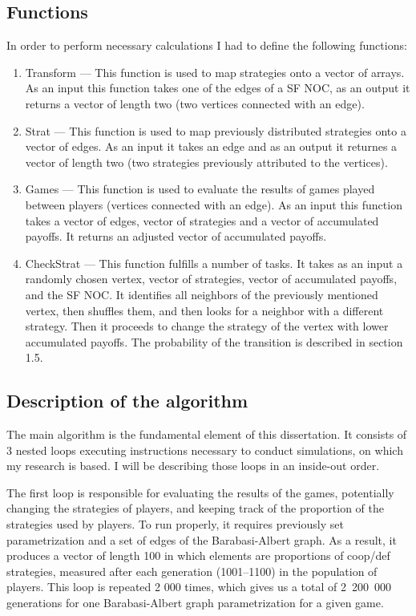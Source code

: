 \documentclass[english, twoside, 12pt, a4paper]{article}
\theoremstyle{definition}
\theoremstyle{plain}
\theoremstyle{remark}
\begin{document}
\subsection{Functions}
In order to perform necessary calculations I had to define the following functions:

\begin{enumerate}
  \item Transform --- This function is used to map strategies onto a vector of arrays. As an input this function takes one of the edges of a SF NOC,
   as an output it returns a vector of length two (two vertices connected with an edge).
  \item Strat --- This function is used to map previously distributed strategies onto a vector of edges. As an input it takes an edge and as an output
   it returnes a vector of length two (two strategies previously attributed to the vertices).
  \item Games --- This function is used to evaluate the results of games played between players (vertices connected with an edge). As an input this function
   takes a vector of edges, vector of strategies and a vector of accumulated payoffs. It returns an adjusted vector of accumulated payoffs.
  \item CheckStrat --- This function fulfills a number of tasks. It takes as an input a randomly chosen vertex, vector of strategies, vector of accumulated
  payoffs, and the SF NOC. It identifies all neighbors of the previously mentioned vertex, then shuffles them, and then looks for a neighbor
  with a different strategy. Then it proceeds to change the strategy of the vertex with lower accumulated payoffs. The probability of the transition 
  is described in section 1.5. 
\end{enumerate}

\subsection{Description of the algorithm}

The main algorithm is the fundamental element of this dissertation. It consists of 3 nested loops executing instructions necessary to conduct simulations, on which my research is based. I will be describing those loops in an inside-out order. 

The first loop is responsible for evaluating the results of the games, potentially changing the strategies of players, and keeping track of the proportion of the strategies used by players. To run properly, it requires previously set parametrization and a set of edges of the Barabasi-Albert graph. As a result, it produces a vector of length 100 in which elements are proportions of coop/def strategies, measured after each generation (1001--1100) in the population of players. This loop is repeated 2 000 times, which gives us a total of 2~200~000 generations for one Barabasi-Albert graph parametrization for a given game.
\end{document}
